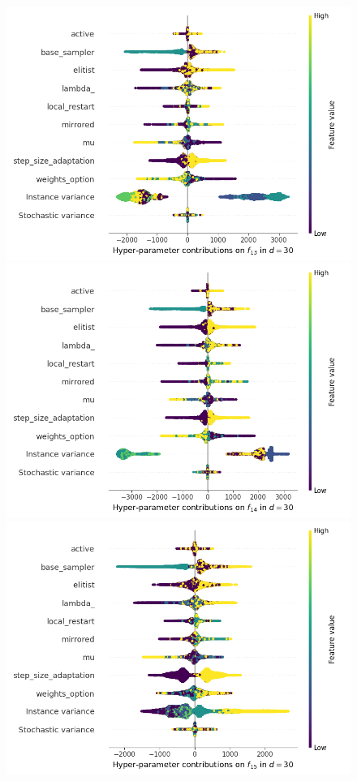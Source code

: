 \begin{figure}[t]
	\includegraphics[height=0.15\textheight,trim=0mm 0mm 30mm 0mm,clip]{cma_img_new/img_summary_f13_d30.png}
	\includegraphics[height=0.15\textheight,trim=60mm 0mm 30mm 0mm,clip]{cma_img_new/img_summary_f14_d30.png}
	\includegraphics[height=0.15\textheight,trim=60mm 0mm 30mm 0mm,clip]{cma_img_new/img_summary_f15_d30.png}

\end{figure}
